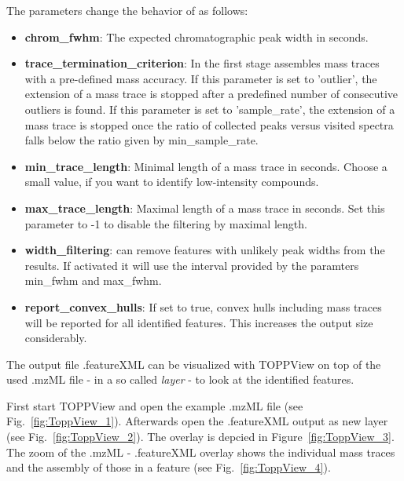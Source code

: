 The parameters change the behavior of  as follows:
\begin{itemize}
\item \textbf{chrom\_fwhm}: The expected chromatographic peak width in seconds.
\item \textbf{trace\_termination\_criterion}: In the first stage  assembles mass traces with a pre-defined mass accuracy. If this parameter is set to 'outlier', the extension of a mass trace is stopped after a predefined number of consecutive outliers is found. If this parameter is set to 'sample\_rate', the extension of a mass trace is stopped once the ratio of collected peaks versus visited spectra falls below the ratio given by min\_sample\_rate.
\item \textbf{min\_trace\_length}: Minimal length of a mass trace in seconds. Choose a small value, if you want to identify low-intensity compounds.
\item \textbf{max\_trace\_length}: Maximal length of a mass trace in seconds. Set this parameter to -1 to disable the filtering by maximal length.
\item \textbf{width\_filtering}:  can remove features with unlikely peak widths from the results. If activated it will use the interval provided by the paramters min\_fwhm and max\_fwhm.
\item \textbf{report\_convex\_hulls}: If set to true, convex hulls including mass traces will be reported for all identified features. This increases the output size considerably.
\end{itemize}

\noindent The output file .featureXML can be visualized with TOPPView on top of the used .mzML file - in a so called 	\textit{layer} - to look at the identified features.
\newline
 
\noindent First start TOPPView and open the example .mzML file (see Fig.~\ref{fig:ToppView_1}). Afterwards open the .featureXML output as new layer (see Fig.~\ref{fig:ToppView_2}). The overlay is depcied in Figure~\ref{fig:ToppView_3}. The zoom of the .mzML - .featureXML overlay shows the individual mass traces and the assembly of those in a feature (see Fig.~\ref{fig:ToppView_4}).

